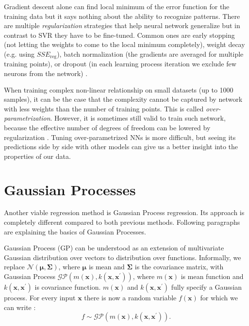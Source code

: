 Gradient descent alone can find local minimum of the error function for the training data but it says nothing about the ability to recognize patterns. There are multiple \textit{regularization} strategies that help neural network generalize but in contrast to SVR they have to be fine-tuned. Common ones are early stopping (not letting the weights to come to the local minimum completely), weight decay (e.g. using $SSE_{\mathrm{reg}}$), batch normalization (the gradients are averaged for multiple training points), or dropout (in each learning process iteration we exclude few neurons from the network) \cite{bishop2006,srivastava2014}.

When training complex non-linear relationship on small datasets (up to 1000 samples), it can be the case that the complexity cannot be captured by network with less weights than the number of training points. This is called \textit{over-parametrization}. However, it is sometimes still valid to train such network, because the effective number of degrees of freedom can be lowered by regularization \cite{barlett1998,ingrassia2005}. Tuning over-parametrized NNs is more difficult, but seeing its predictions side by side with other models can give us a better insight into the properties of our data.

\section{Gaussian Processes}
Another viable regression method is Gaussian Process regression. Its approach is completely different compared to both previous methods. Following paragraphs are explaining the basics of Gaussian Processes.

Gaussian Process (GP) can be understood as an extension of multivariate Gaussian distribution over vectors to distribution over functions. Informally, we replace $\mathcal{N}(\bm{\mu},\bm{\Sigma})$, where $\bm{\mu}$ is mean and $\bm{\Sigma}$ is the covariance matrix, with Gaussian Process $\mathcal{GP}(m(\bm{x}),k(\bm{x},\bm{x}^\prime))$, where $m(\bm{x})$ is mean function and $k(\bm{x},\bm{x}^\prime)$ is covariance function. $m(\bm{x})$  and $k(\bm{x},\bm{x}^\prime)$ fully specify a Gaussian process. For every input $\bm{x}$ there is now a random variable $f(\bm{x})$ for which we can write \cite{rasmussen2004}:
\begin{equation}
	\label{eq:gp}
	f\sim\mathcal{GP}(m(\bm{x}),k(\bm{x},\bm{x}^\prime)).
\end{equation}

